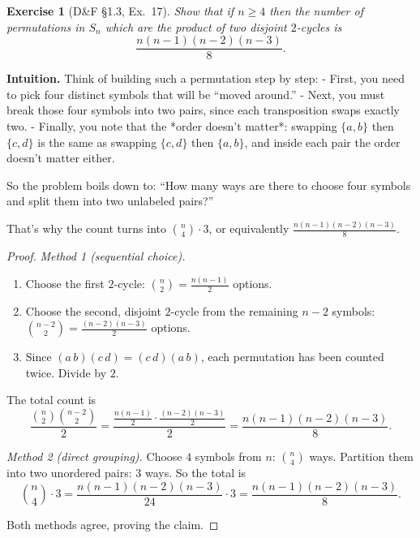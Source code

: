 \documentclass[12pt]{article}
\newtheorem{exercise}[theorem]{Exercise}
\theoremstyle{definition}
\begin{document}
\newpage

\begin{exercise}[D\&F §1.3, Ex.~17]
Show that if $n\ge 4$ then the number of permutations in $S_n$ which are the product
of two disjoint $2$-cycles is
\[
\frac{n(n-1)(n-2)(n-3)}{8}.
\]
\end{exercise}

\dotfill

\noindent\textbf{Intuition.}
Think of building such a permutation step by step:
- First, you need to pick four distinct symbols that will be “moved around.”  
- Next, you must break those four symbols into two pairs, since each transposition swaps exactly two.  
- Finally, you note that the *order doesn’t matter*: swapping $\{a,b\}$ then $\{c,d\}$ is the same as swapping $\{c,d\}$ then $\{a,b\}$, and inside each pair the order doesn’t matter either.  

So the problem boils down to: “How many ways are there to choose four symbols and split them into two unlabeled pairs?”  

That’s why the count turns into $\binom{n}{4}\cdot 3$, or equivalently $\tfrac{n(n-1)(n-2)(n-3)}{8}$.

\dotfill

\begin{proof}
\emph{Method 1 (sequential choice).}
\begin{enumerate}
\item Choose the first $2$-cycle: $\binom{n}{2}=\tfrac{n(n-1)}{2}$ options.
\item Choose the second, disjoint $2$-cycle from the remaining $n-2$ symbols:
$\binom{n-2}{2}=\tfrac{(n-2)(n-3)}{2}$ options.
\item Since $(a\,b)(c\,d)=(c\,d)(a\,b)$, each permutation has been counted twice.
Divide by $2$.
\end{enumerate}
The total count is
\[
\frac{\binom{n}{2}\binom{n-2}{2}}{2}
=\frac{\tfrac{n(n-1)}{2}\cdot \tfrac{(n-2)(n-3)}{2}}{2}
=\frac{n(n-1)(n-2)(n-3)}{8}.
\]

\smallskip

\emph{Method 2 (direct grouping).}
Choose $4$ symbols from $n$: $\binom{n}{4}$ ways.
Partition them into two unordered pairs: $3$ ways.
So the total is
\[
\binom{n}{4}\cdot 3
=\frac{n(n-1)(n-2)(n-3)}{24}\cdot 3
=\frac{n(n-1)(n-2)(n-3)}{8}.
\]

Both methods agree, proving the claim.
\end{proof}
\end{document}
